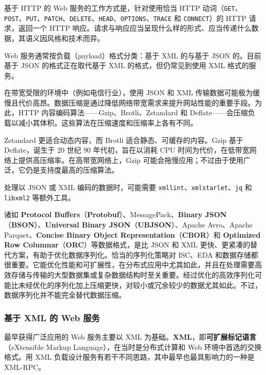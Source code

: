 \label{idx:1576}
基于 HTTP 的 Web 服务的工作方式是，针对使用恰当 HTTP 动词（\texttt{GET}、\texttt{POST}、\texttt{PUT}、\texttt{PATCH}、\texttt{DELETE}、\texttt{HEAD}、\texttt{OPTIONS}、\texttt{TRACE} 和 \texttt{CONNECT}）的 HTTP 请求，返回一个 HTTP 响应。请求与响应应当呈现什么样的形式、应当传递什么数据，其语义因风格和技术而异。

Web 服务通常按负载（payload）格式分类：基于 XML 的与基于 JSON 的。目前基于 JSON 的格式正在取代基于 XML 的格式，但仍常见到使用 XML 格式的服务。

在带宽受限的环境中（例如电信行业），使用 JSON 和 XML 传输数据可能极为缓慢且代价高昂。数据压缩是通过降低网络带宽需求来提升网站性能的重要手段。为此，HTTP 内容编码算法——Gzip、Brotli、Zstandard 和 Deflate——会压缩负载以减小其体积。这些算法在压缩速度和压缩率上各有不同。

\label{idx:1577}
Zstandard 更适合动态内容，而 Brotli 适合静态、可缓存的内容。Gzip 基于 Deflate，诞生于 20 世纪 90 年代初，旨在以消耗 CPU 时间为代价，在低带宽网络上提供高压缩率。在高带宽网络上，Gzip 可能会拖慢应用；不过由于使用广泛，它仍是支持度最高的压缩算法。

\label{idx:1578}
\label{idx:1579}
处理以 JSON 或 XML 编码的数据时，可能需要 \texttt{xmllint}、\texttt{xmlstarlet}、\texttt{jq} 和 \texttt{libxml2} 等额外工具。

\label{idx:1580}
\label{idx:1581}
\label{idx:1582}
诸如 \textbf{Protocol Buffers}（\textbf{Protobuf}）、MessagePack、\textbf{Binary JSON}（\textbf{BSON}）、\textbf{Universal Binary JSON}（\textbf{UBJSON}）、Apache Avro、Apache Parquet、\textbf{Concise Binary Object Representation}（\textbf{CBOR}）和 \textbf{Optimized Row Columnar}（\textbf{ORC}）等数据格式，是比 JSON 和 XML 更快、更紧凑的替代方案，有助于优化数据序列化。恰当的序列化策略对 ISC、EDA 和数据存储都很重要。它能优化性能和可扩展性，在分布式应用中尤其如此，并且在处理需要高效存储与传输的大型数据集或复杂数据结构时至关重要。经过优化的高效序列化可能比未经优化的序列化加上压缩更快，对较小或冗余较少的数据尤其如此。不过，数据序列化并不能完全替代数据压缩。

\subsubsection{基于 XML 的 Web 服务}

\label{idx:1583}
\label{idx:1584}
最早获得广泛应用的 Web 服务主要以 XML 为基础。\textbf{XML}，即\textbf{可扩展标记语言}（eXtensible Markup Language），在当时是分布式计算和 Web 环境中首选的交换格式。用 XML 负载设计服务有若干不同思路，其中最早也最具影响力的一种是 XML-RPC。


